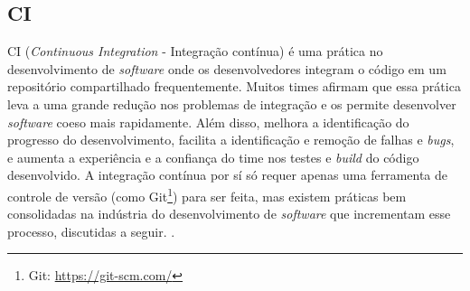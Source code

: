 


\subsection{CI}
CI (\emph{Continuous Integration} - Integração contínua) é uma prática no desenvolvimento de \emph{software} onde os desenvolvedores integram o código em um repositório compartilhado frequentemente. Muitos times afirmam que essa prática leva a uma grande redução nos problemas de integração e os permite desenvolver \emph{software} coeso mais rapidamente. Além disso, melhora a identificação do progresso do desenvolvimento, facilita a identificação e remoção de falhas e \emph{bugs}, e aumenta a experiência e a confiança do time nos testes e \emph{build} do código desenvolvido. A integração contínua por sí só requer apenas uma ferramenta de controle de versão (como Git\footnote{Git: \url{https://git-scm.com/}}) para ser feita, mas existem práticas bem consolidadas na indústria do desenvolvimento de \emph{software} que incrementam esse processo, discutidas a seguir. \cite{martin-fowler-continuous-integration}.

